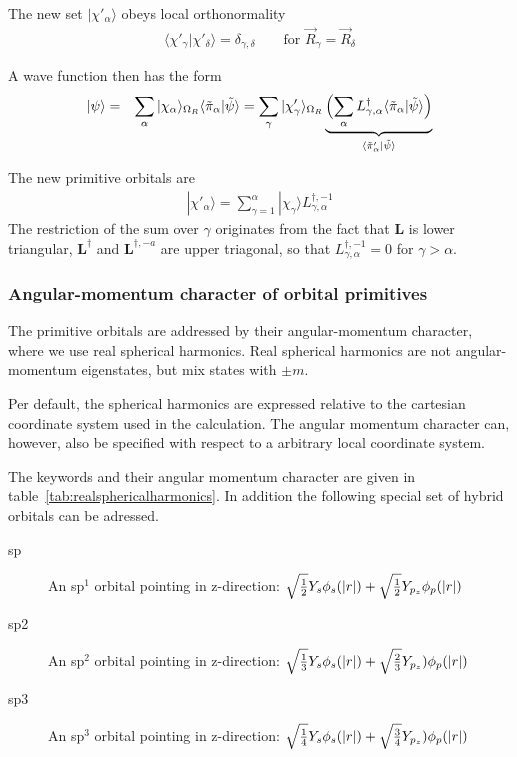 \documentclass[final,12pt]{article}
\newcommand{\mat}[1]{\mathbf{#1}}
\begin{document}
{{{{{{The new set $|\chi'_\alpha\rangle$ obeys local orthonormality
\begin{eqnarray}
\langle\chi'_\gamma|\chi'_\delta\rangle=
\delta_{\gamma,\delta} \qquad\text{for $\vec{R}_\gamma=\vec{R}_\delta$}
\end{eqnarray}

A wave function then has the form
\begin{eqnarray}
|\psi\rangle
&=&\sum_{\alpha}
|\chi_\alpha\rangle_{\Omega_R}
\langle\tilde{\pi}_\alpha|\tilde\psi\rangle
=\sum_{\gamma}
|\chi'_\gamma\rangle_{\Omega_R}
\underbrace{\Bigl(
\sum_{\alpha}
L^\dagger_{\gamma,\alpha}
\langle\tilde{\pi}_\alpha|\tilde\psi\rangle
\Bigr)}_{\langle\tilde{\pi}'_\alpha|\tilde\psi\rangle}
\end{eqnarray}

The new primitive orbitals are
\begin{eqnarray}
|\chi'_\alpha\rangle=\sum_{\gamma=1}^{\alpha}
|\chi_\gamma\rangle L^{\dagger,-1}_{\gamma,\alpha}
\end{eqnarray}
The restriction of the sum over $\gamma$ originates from the fact that
$\mat{L}$ is lower triangular, $\mat{L}^\dagger$ and
$\mat{L}^{\dagger,-a}$ are upper triagonal, so that
$L^{\dagger,-1}_{\gamma,\alpha}=0$ for $\gamma>\alpha$.

\subsubsection{Angular-momentum character of orbital primitives}
\label{sec:dostoolorbitalprimitivesangularmomentum}
The primitive orbitals are addressed by their angular-momentum
character, where we use real spherical harmonics. Real spherical
harmonics are not angular-momentum eigenstates, but mix states with
$\pm m$. 

Per default, the spherical harmonics are expressed relative to the
cartesian coordinate system used in the calculation.  The angular
momentum character can, however, also be specified with respect to a
arbitrary local coordinate system.

The keywords and their angular momentum character are given in
table~\ref{tab:realsphericalharmonics}. In addition the following
special set of hybrid orbitals can be adressed.
\begin{description}
\item[sp] An sp$^1$ orbital pointing in z-direction: 
$\sqrt{1\over{2}}Y_s \phi_s(|r|) + \sqrt{1\over{2}}Y_{p_z}\phi_p(|r|)$
\item[sp2] An sp$^2$ orbital pointing in z-direction: 
$\sqrt{1\over{3}}Y_s\phi_s(|r|) + \sqrt{2\over{3}}Y_{p_z})\phi_p(|r|)$
\item[sp3] An sp$^3$ orbital pointing in z-direction: 
$\sqrt{1\over{4}}Y_s\phi_s(|r|) + \sqrt{3\over{4}}Y_{p_z})\phi_p(|r|)$
\end{description}

}}}}}}
\end{document}

